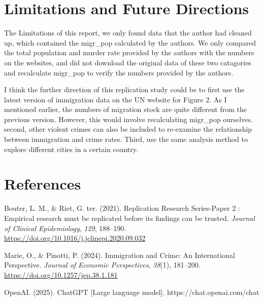 \documentclass[
  jou,
  floatsintext,
  longtable,
  nolmodern,
  notxfonts,
  notimes,
  colorlinks=true,linkcolor=blue,citecolor=blue,urlcolor=blue]{apa7}
\newlength{\cslhangindent}
\newenvironment{CSLReferences}[2] %
 {\begin{list}{}{%
  \setlength{\itemindent}{0pt}
  \setlength{\leftmargin}{0pt}
  \setlength{\parsep}{0pt}
  \ifodd #1
   \setlength{\leftmargin}{\cslhangindent}
   \setlength{\itemindent}{-1\cslhangindent}
  \fi
  \setlength{\itemsep}{#2\baselineskip}}}
 {\end{list}}
\begin{document}
\section{Limitations and Future
Directions}\label{limitations-and-future-directions}

The Limitations of this report, we only found data that the author had
cleaned up, which contained the migr\_pop calculated by the authors. We
only compared the total population and murder rate provided by the
authors with the numbers on the websites, and did not download the
original data of these two catagories and recalculate migr\_pop to
verify the numbers provided by the authors.

I think the further direction of this replication study could be to
first use the latest version of immigration data on the UN website for
Figure 2. As I mentioned earlier, the numbers of migration stock are
quite different from the previous version. However, this would involve
recalculating migr\_pop ourselves. second, other violent crimes can also
be included to re-examine the relationship between immigration and crime
rates. Third, use the same analysis method to explore different cities
in a certain country.

\section{References}\label{references}

\label{refs}
\begin{CSLReferences}{1}{0}
Bouter, L. M., \& Riet, G. ter. (2021). Replication Research
Series-Paper 2 : Empirical research must be replicated before its
findings can be trusted. \emph{Journal of Clinical Epidemiology},
\emph{129}, 188--190.
\url{https://doi.org/10.1016/j.jclinepi.2020.09.032}

Marie, O., \& Pinotti, P. (2024). Immigration and Crime: An
International Perspective. \emph{Journal of Economic Perspectives},
\emph{38}(1), 181--200. \url{https://doi.org/10.1257/jep.38.1.181}

\end{CSLReferences}

OpenAI. (2025). ChatGPT {[}Large language model{]}.
https://chat.openai.com/chat

\appendix

\section{}\label{}

\section{}\label{apx-a}
\end{document}
